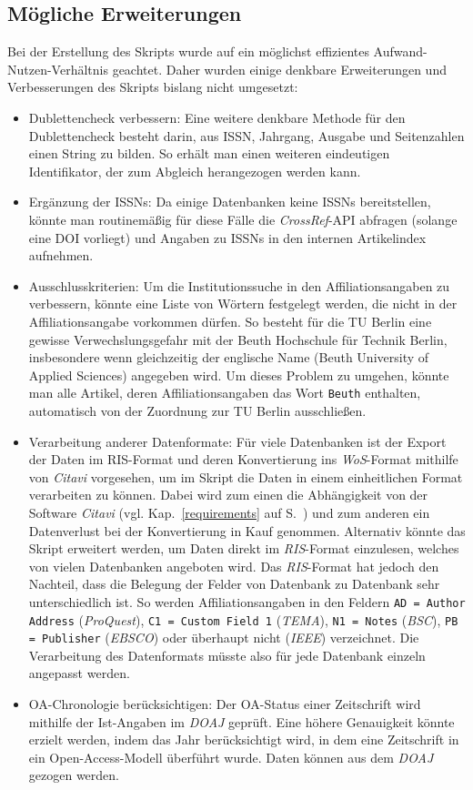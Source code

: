 \subsection{Mögliche Erweiterungen}
Bei der Erstellung des Skripts wurde auf ein möglichst effizientes Aufwand-Nutzen-Verhältnis geachtet. Daher wurden einige denkbare Erweiterungen und Verbesserungen des Skripts bislang nicht umgesetzt:
\begin{itemize}
\item Dublettencheck verbessern: Eine weitere denkbare Methode für den Dublettencheck besteht darin, aus ISSN, Jahrgang, Ausgabe und Seitenzahlen einen String zu bilden. So erhält man einen weiteren eindeutigen Identifikator, der zum Abgleich herangezogen werden kann.
\item Ergänzung der ISSNs: Da einige Datenbanken keine ISSNs bereitstellen, könnte man routinemäßig für diese Fälle die \textit{CrossRef}-API abfragen (solange eine DOI vorliegt) und Angaben zu ISSNs in den internen Artikelindex aufnehmen.
\item Ausschlusskriterien: Um die Institutionssuche in den Affiliationsangaben zu verbessern, könnte eine Liste von Wörtern festgelegt werden, die nicht in der Affiliationsangabe vorkommen dürfen. So besteht für die TU Berlin eine gewisse Verwechslungsgefahr mit der Beuth Hochschule für Technik Berlin, insbesondere wenn gleichzeitig der englische Name (Beuth University of Applied Sciences) angegeben wird. Um dieses Problem zu umgehen, könnte man alle Artikel, deren Affiliationsangaben das Wort \texttt{Beuth} enthalten, automatisch von der Zuordnung zur TU Berlin ausschließen.
\item Verarbeitung anderer Datenformate: Für viele Datenbanken ist der Export der Daten im RIS-Format und deren Konvertierung ins  \textit{WoS}-Format mithilfe von \textit{Citavi} vorgesehen, um im Skript die Daten in einem einheitlichen Format verarbeiten zu können. Dabei wird zum einen die Abhängigkeit von der Software \textit{Citavi} (vgl. Kap.~\ref{requirements} auf S.~\pageref{requirements}) und zum anderen ein Datenverlust bei der Konvertierung in Kauf genommen. Alternativ könnte das Skript erweitert werden, um Daten direkt im \textit{RIS}-Format einzulesen, welches von vielen Datenbanken angeboten wird. Das \textit{RIS}-Format hat jedoch den Nachteil, dass die Belegung der Felder von Datenbank zu Datenbank sehr unterschiedlich ist. So werden Affiliationsangaben in den Feldern \texttt{AD = Author Address} (\textit{ProQuest}), \texttt{C1 = Custom Field 1} (\textit{TEMA}), \texttt{N1 = Notes} (\textit{BSC}), \texttt{PB = Publisher} (\textit{EBSCO}) oder überhaupt nicht (\textit{IEEE}) verzeichnet. Die Verarbeitung des Datenformats müsste also für jede Datenbank einzeln angepasst werden.
\item OA-Chronologie berücksichtigen: Der OA-Status einer Zeitschrift wird mithilfe der Ist-Angaben im \textit{DOAJ} geprüft. Eine höhere Genauigkeit könnte erzielt werden, indem das Jahr berücksichtigt wird, in dem eine Zeitschrift in ein Open-Access-Modell überführt wurde. Daten können aus dem \textit{DOAJ} gezogen werden.
\end{itemize}